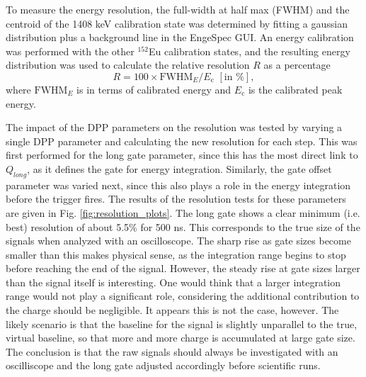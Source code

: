 To measure the energy resolution, the full-width at half max (FWHM) and the centroid of the 1408 keV calibration state was determined by fitting a gaussian distribution plus a background line in the EngeSpec GUI. An energy calibration was performed with the other $^{152}$Eu calibration states, and the resulting energy distribution was used to calculate the relative resolution $R$ as a percentage
\begin{equation}
R = 100 \times \mathrm{FWHM}_{E}/E_{\mathrm{c}} \,\, [\mathrm{in} \, \, \%],
\end{equation}
where $\mathrm{FWHM}_{E}$ is in terms of calibrated energy and $E_{\mathrm{c}}$ is the calibrated peak energy.

The impact of the DPP parameters on the resolution was tested by varying a single DPP parameter and calculating the new resolution for each step. This was first performed for the long gate parameter, since this has the most direct link to $Q_{long}$, as it defines the gate for energy integration. Similarly, the gate offset parameter was varied next, since this also plays a role in the energy integration before the trigger fires. The results of the resolution tests for these parameters are given in Fig. \ref{fig:resolution_plots}. The long gate shows a clear minimum (i.e. best) resolution of about 5.5$\%$ for 500 ns. This corresponds to the true size of the signals when analyzed with an oscilloscope. The sharp rise as gate sizes become smaller than this makes physical sense, as the integration range begins to stop before reaching the end of the signal. However, the steady rise at gate sizes larger than the signal itself is interesting. One would think that a larger integration range would not play a significant role, considering the additional contribution to the charge should be negligible. It appears this is not the case, however. The likely scenario is that the baseline for the signal is slightly unparallel to the true, virtual baseline, so that more and more charge is accumulated at large gate size. The conclusion is that the raw signals should always be investigated with an oscilliscope and the long gate adjusted accordingly before scientific runs.

